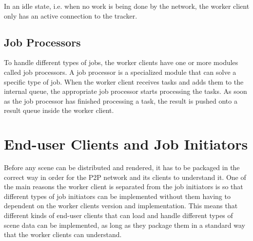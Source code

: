 In an idle state, i.e. when no work is being done by the network, the worker client only has an active connection to the tracker.






\subsection{Job Processors}
  To handle different types of jobs, the worker clients have one or more modules called job processors. A job processor is a specialized module that can solve a specific type of job. When the worker client receives tasks and adds them to the internal queue, the appropriate job processor starts processing the tasks. As soon as the job processor has finished processing a task, the result is pushed onto a result queue inside the worker client.

\section{End-user Clients and Job Initiators}
Before any scene can be distributed and rendered, it has to be packaged in the correct way in order for the P2P network and its clients to understand it. One of the main reasons the worker client is separated from the job initiators is so that different types of job initiators can be implemented without them having to dependent on the worker clients version and implementation. This means that  different kinds of end-user clients that can load and handle different types of scene data can be implemented, as long as they package them in a standard way that the worker clients can understand.

